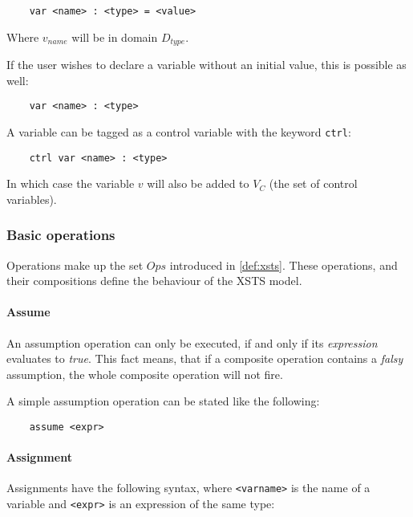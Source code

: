 \begin{Verbatim}
	var <name> : <type> = <value>
\end{Verbatim}

Where \(v_{name}\) will be in domain \(D_{type}\).

If the user wishes to declare a variable without an initial value, this is possible as well:

\begin{Verbatim}
	var <name> : <type>
\end{Verbatim}

A variable can be tagged as a control variable with the keyword \verb|ctrl|:

\begin{Verbatim}
	ctrl var <name> : <type>
\end{Verbatim}

In which case the variable \(v\) will also be added to \(V_C\) (the set of control variables).

\subsubsection{Basic operations}

Operations make up the set \(Ops\) introduced in \autoref{def:xsts}. These operations, and their compositions define the behaviour of the XSTS model.

\paragraph{Assume}
 
An assumption operation can only be executed, if and only if its \emph{expression} evaluates to \emph{true}. This fact means, that if a composite operation contains a \emph{falsy} assumption, the whole composite operation will not fire.

A simple assumption operation can be stated like the following:
 
\begin{Verbatim}
	assume <expr>
\end{Verbatim}

\paragraph{Assignment}

Assignments have the following syntax, where \verb|<varname>| is the name of a variable and
\verb|<expr>| is an expression of the same type:


